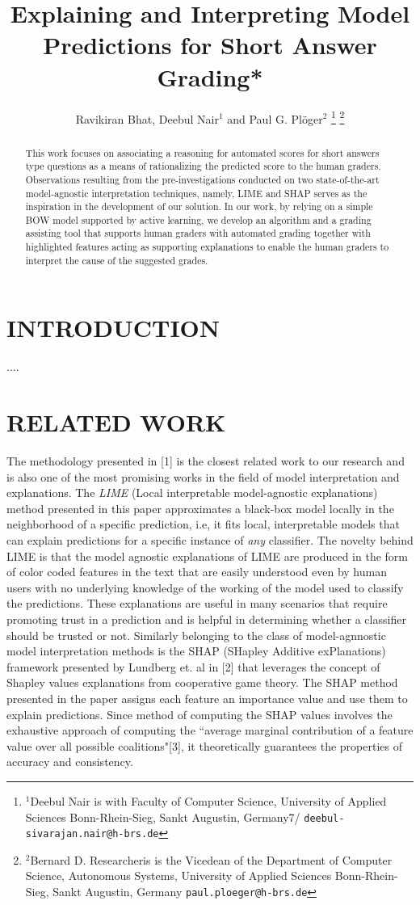 \documentclass[letterpaper, 10 pt, conference]{ieeeconf}  %
\title{\LARGE \bf
Explaining and Interpreting Model Predictions for Short Answer Grading*
}
\author{Ravikiran Bhat, Deebul Nair$^{1}$ and Paul G. Pl{\"o}ger$^{2}$%
\thanks{$^{1}$Deebul Nair is with Faculty of Computer Science,
        University of Applied Sciences Bonn-Rhein-Sieg, Sankt Augustin, Germany7/
        {\tt\small deebul-sivarajan.nair@h-brs.de}}%
\thanks{$^{2}$Bernard D. Researcheris is the Vicedean of the Department of Computer Science, Autonomous Systems, University of Applied Sciences Bonn-Rhein-Sieg, Sankt Augustin, Germany
        {\tt\small paul.ploeger@h-brs.de}}%
}
\begin{document}
\maketitle
\thispagestyle{empty}
\pagestyle{empty}


\begin{abstract}

This work focuses on associating a reasoning for automated scores for short answers type questions as a means of rationalizing the predicted score to the human graders. Observations resulting from the pre-investigations conducted on two state-of-the-art model-agnostic interpretation techniques, namely, LIME and SHAP serves as the inspiration in the development of our solution. In our work, by relying on a simple BOW model supported by active learning, we develop an algorithm and a grading assisting tool that supports human graders with automated grading together with highlighted features acting as supporting explanations to enable the human graders to interpret the cause of the suggested grades. 

\end{abstract}


\section{INTRODUCTION}

....

\section{RELATED WORK}
The methodology presented in [1] is the closest related work to our research and is also one of the most promising works in the field of model interpretation and explanations. The \textit{LIME} (Local interpretable model-agnostic explanations) method presented in this paper approximates a black-box model locally in the neighborhood of a specific prediction, i.e, it fits local, interpretable models that can explain predictions for a specific instance of \textit{any} classifier. The novelty behind LIME is that the model agnostic explanations of LIME are produced in the form of color coded features in the text that are easily understood even by human users with no underlying knowledge of the working of the model used to classify the predictions. These explanations are useful in many scenarios that require promoting trust in a prediction and is helpful in determining whether a classifier should be trusted or not. Similarly belonging to the class of model-agnnostic model interpretation methods is the SHAP (SHapley Additive exPlanations) framework presented by Lundberg et. al in [2] that leverages the concept of Shapley values explanations from cooperative game theory. The SHAP method presented in the paper assigns each feature an importance value and use them to explain predictions. Since method of computing the SHAP values involves the exhaustive approach of computing the ``average marginal contribution of a feature value over all possible coalitions"[3], it theoretically guarantees the properties of accuracy and consistency.
\end{document}
